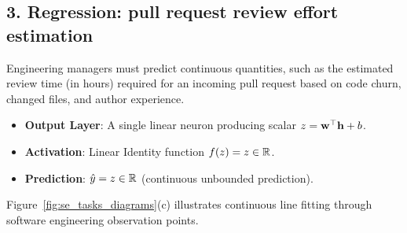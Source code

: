 \documentclass[../../main.tex]{subfiles}
\begin{document}
\subsection{3. Regression: pull request review effort estimation}
Engineering managers must predict continuous quantities, such as the estimated review time (in hours) required for an incoming pull request based on code churn, changed files, and author experience.
\begin{itemize}
    \item \textbf{Output Layer}: A single linear neuron producing scalar $z = \mathbf{w}^\top \mathbf{h} + b$.
    \item \textbf{Activation}: Linear Identity function $f(z) = z \in \mathbb{R}$.
    \item \textbf{Prediction}: $\hat{y} = z \in \mathbb{R}$ (continuous unbounded prediction).
\end{itemize}
Figure~\ref{fig:se_tasks_diagrams}(c) illustrates continuous line fitting through software engineering observation points.
\end{document}
